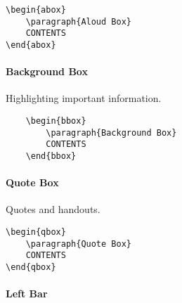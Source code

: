 \documentclass[itdr]{subfiles}
\begin{document}
\skipline[0.5\baselineskip]

\begin{lstlisting}
\begin{abox}
	\paragraph{Aloud Box}
	CONTENTS
\end{abox}	
\end{lstlisting}

\vfill

\begin{bbox}
	\paragraph{Background Box}
	Highlighting important information.\\
	\lipsum[66]
\end{bbox}

\skipline[0.5\baselineskip]

\begin{lstlisting}
	\begin{bbox}
		\paragraph{Background Box}
		CONTENTS
	\end{bbox}
\end{lstlisting}

\break

\begin{qbox}
	\paragraph{Quote Box}
	Quotes and handouts.\\
	\lipsum[66]
\end{qbox}

\skipline[0.5\baselineskip]

\begin{lstlisting}
\begin{qbox}
	\paragraph{Quote Box}
	CONTENTS
\end{qbox}
\end{lstlisting}

\vfill

\begin{lbar}
	\paragraph{Left Bar}
	\lipsum[66]
\end{lbar}
\end{document}
